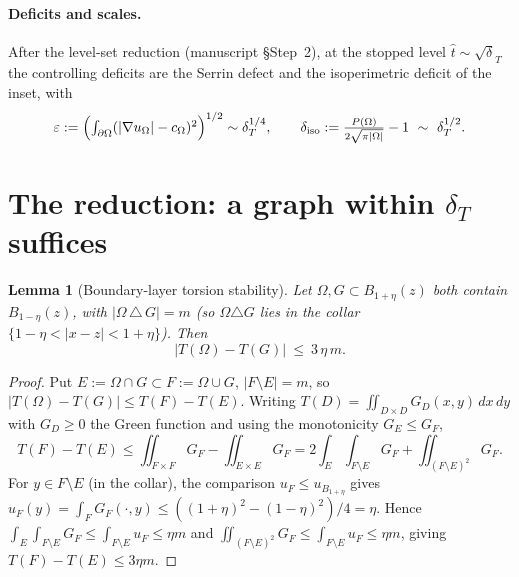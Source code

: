 \documentclass[11pt]{article}
\newtheorem{lemma}[theorem]{Lemma}
\theoremstyle{definition}
\newcommand{\Om}{\Omega}
\newcommand{\eps}{\varepsilon}
\newcommand{\dT}{\delta_T}
\newcommand{\diso}{\delta_{\mathrm{iso}}}
\newcommand{\abs}[1]{\left|#1\right|}
\begin{document}
\paragraph{Deficits and scales.}
After the level-set reduction (manuscript \S Step~2), at the stopped level
$\hat t\sim\sqrt\dT$ the controlling deficits are the Serrin defect and the
isoperimetric deficit of the inset, with
\begin{equation}\label{eq:scales}
   \eps:=\Bigl(\textstyle\int_{\partial\Om}(|\nabla u_\Om|-c_\Om)^2\Bigr)^{1/2}
   \sim\dT^{1/4},
   \qquad
   \diso:=\frac{P(\Om)}{2\sqrt{\pi\abs\Om}}-1\ \sim\ \dT^{1/2}.
\end{equation}

\section{The reduction: a graph within $\dT$ suffices}
\label{sec:reduction}

\begin{lemma}[Boundary-layer torsion stability]\label{lem:torsion-stab}
Let $\Om,G\subset B_{1+\eta}(z)$ both contain $B_{1-\eta}(z)$, with
$\abs{\Om\,\triangle\,G}=m$ \textup{(}so $\Om\triangle G$ lies in the collar
$\{1-\eta<\abs{x-z}<1+\eta\}$\textup{)}. Then
\begin{equation}\label{eq:torsion-stab}
   \abs{T(\Om)-T(G)}\ \le\ 3\,\eta\,m .
\end{equation}
\end{lemma}

\begin{proof}
Put $E:=\Om\cap G\subset F:=\Om\cup G$, $\abs{F\setminus E}=m$, so
$\abs{T(\Om)-T(G)}\le T(F)-T(E)$. Writing $T(D)=\iint_{D\times D}
G_D(x,y)\,dx\,dy$ with $G_D\ge0$ the Green function and using the
monotonicity $G_E\le G_F$,
\[
   T(F)-T(E)\le\iint_{F\times F}G_F-\iint_{E\times E}G_F
   =2\!\int_E\!\int_{F\setminus E}\!G_F+\iint_{(F\setminus E)^2}\!G_F .
\]
For $y\in F\setminus E$ (in the collar), the comparison
$u_F\le u_{B_{1+\eta}}$ gives $u_F(y)=\int_F G_F(\cdot,y)\le
((1+\eta)^2-(1-\eta)^2)/4=\eta$. Hence
$\int_E\int_{F\setminus E}G_F\le\int_{F\setminus E}u_F\le\eta m$ and
$\iint_{(F\setminus E)^2}G_F\le\int_{F\setminus E}u_F\le\eta m$, giving
$T(F)-T(E)\le 3\eta m$.
\end{proof}
\end{document}
